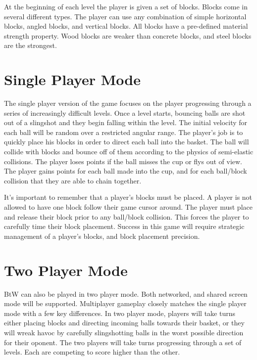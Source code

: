 \documentclass[12pt]{article} %
\begin{document}
At the beginning of each level the player is given a set of blocks. Blocks come in several different types. The player can use any combination of
simple horizontal blocks, angled blocks, and vertical blocks. All blocks have a pre-defined material strength property. Wood blocks are weaker than
concrete blocks, and steel blocks are the strongest.

\section{Single Player Mode} %

The single player version of the game focuses on the player progressing through a series of increasingly difficult levels.
Once a level starts, bouncing balls are shot out of a slingshot and they begin falling within the level. The initial velocity
for each ball will be random over a restricted angular range. The player's job is to quickly place his blocks in order to direct each
ball into the basket. The ball will collide with blocks and bounce off of them according to the physics of semi-elastic collisions. 
The player loses points if the ball misses the cup or flys out of view. The player gains points for each ball made into the cup, and for each ball/block 
collision that they are able to chain together.

It's important to remember that a player's blocks must be placed. A player is not allowed to have one block follow their game cursor around. 
The player must place and release their block prior to any ball/block collision. This forces the player to carefully time their block placement. Success
in this game will require strategic management of a player's blocks, and block placement precision.

\section{Two Player Mode} %
BtW can also be played in two player mode. Both networked, and shared screen mode will be supported. Multiplayer gameplay closely matches
the single player mode with a few key differences. In two player mode, players will take turns either placing blocks and directing incoming 
balls towards their basket, or they will wreak havoc by carefully slingshotting balls in the worst possible direction for
their oponent. The two players will take turns progressing through a set of levels. Each are competing to score higher than the other.
\end{document}

